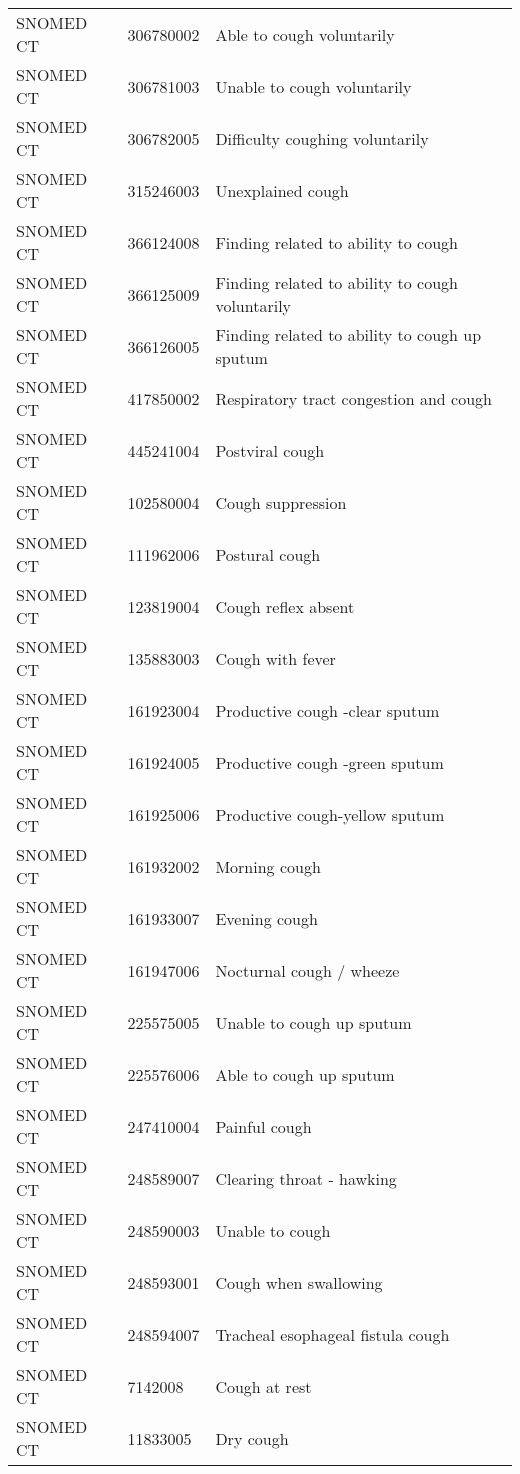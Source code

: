 \begin{longtable}{p{}p{}p{}}
  SNOMED CT & 306780002 & Able to cough voluntarily \\ 
  SNOMED CT & 306781003 & Unable to cough voluntarily \\ 
  SNOMED CT & 306782005 & Difficulty coughing voluntarily \\ 
  SNOMED CT & 315246003 & Unexplained cough \\ 
  SNOMED CT & 366124008 & Finding related to ability to cough \\ 
  SNOMED CT & 366125009 & Finding related to ability to cough voluntarily \\ 
  SNOMED CT & 366126005 & Finding related to ability to cough up sputum \\ 
  SNOMED CT & 417850002 & Respiratory tract congestion and cough \\ 
  SNOMED CT & 445241004 & Postviral cough \\ 
  SNOMED CT & 102580004 & Cough suppression \\ 
  SNOMED CT & 111962006 & Postural cough \\ 
  SNOMED CT & 123819004 & Cough reflex absent \\ 
  SNOMED CT & 135883003 & Cough with fever \\ 
  SNOMED CT & 161923004 & Productive cough -clear sputum \\ 
  SNOMED CT & 161924005 & Productive cough -green sputum \\ 
  SNOMED CT & 161925006 & Productive cough-yellow sputum \\ 
  SNOMED CT & 161932002 & Morning cough \\ 
  SNOMED CT & 161933007 & Evening cough \\ 
  SNOMED CT & 161947006 & Nocturnal cough / wheeze \\ 
  SNOMED CT & 225575005 & Unable to cough up sputum \\ 
  SNOMED CT & 225576006 & Able to cough up sputum \\ 
  SNOMED CT & 247410004 & Painful cough \\ 
  SNOMED CT & 248589007 & Clearing throat - hawking \\ 
  SNOMED CT & 248590003 & Unable to cough \\ 
  SNOMED CT & 248593001 & Cough when swallowing \\ 
  SNOMED CT & 248594007 & Tracheal esophageal fistula cough \\ 
  SNOMED CT & 7142008 & Cough at rest \\ 
  SNOMED CT & 11833005 & Dry cough \\ 

\end{longtable}
